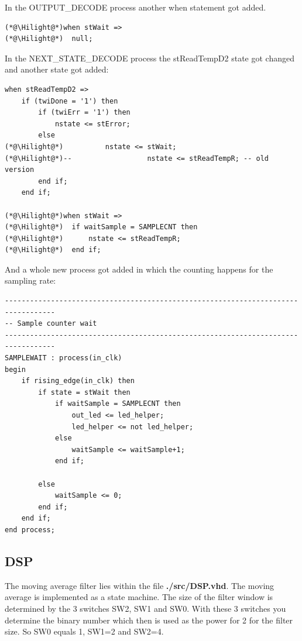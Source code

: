 \documentclass[%
	a4paper,
]
{article}
\begin{document}
In the OUTPUT\_DECODE process another when statement got added.
\begin{lstlisting}
(*@\Hilight@*)when stWait =>
(*@\Hilight@*)	null;
\end{lstlisting}

In the NEXT\_STATE\_DECODE process the stReadTempD2 state got changed and another state got added:
\begin{lstlisting}
when stReadTempD2 =>
	if (twiDone = '1') then
		if (twiErr = '1') then
			nstate <= stError;
		else
(*@\Hilight@*)			nstate <= stWait;
(*@\Hilight@*)--                  nstate <= stReadTempR; -- old version
		end if;
	end if;
 
(*@\Hilight@*)when stWait =>
(*@\Hilight@*)	if waitSample = SAMPLECNT then
(*@\Hilight@*)		nstate <= stReadTempR;
(*@\Hilight@*)	end if;
\end{lstlisting}

And a whole new process got added in which the counting happens for the sampling rate:
\begin{lstlisting}
---------------------------------------------------------------------------------- 
-- Sample counter wait               
----------------------------------------------------------------------------------  
SAMPLEWAIT : process(in_clk)                                       
begin                                                       
	if rising_edge(in_clk) then   
		if state = stWait then                       
			if waitSample = SAMPLECNT then             
				out_led <= led_helper; 
				led_helper <= not led_helper; 
			else 
				waitSample <= waitSample+1; 
			end if;                                                            

		else                                                                   
			waitSample <= 0;
		end if;                  
	end if;                 
end process;
\end{lstlisting}

\subsection{DSP}
\label{sec:dsp}

The moving average filter lies within the file \textbf{./src/DSP.vhd}.
The moving average is implemented as a state machine. The size of the filter window is determined
by the 3 switches SW2, SW1 and SW0. With these 3 switches you determine the binary number which 
then is used as the power for 2 for the filter size. So SW0 equals 1, SW1=2 and SW2=4.
\end{document}
